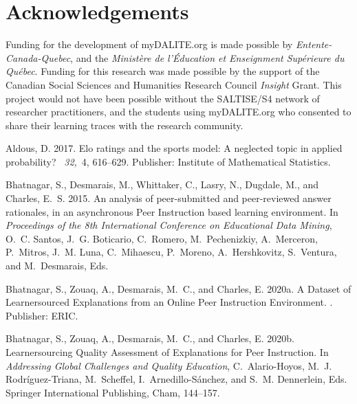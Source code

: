 \documentclass[notitlepage,12pt]{jedm}
\begin{document}
\section*{Acknowledgements}
Funding for the development of myDALITE.org is made possible by 
\textit{Entente-Canada-Quebec}, and the \textit{Ministère de l'Éducation et 
Enseignment Supérieure du Québec}. Funding for this research was made possible 
by the support of the Canadian Social Sciences and Humanities Research Council 
\textit{Insight} Grant. This project would not have been possible without the 
SALTISE/S4 network of researcher practitioners, and the students using 
myDALITE.org who consented to share their learning traces with the research 
community.

 

\begin{thebibliography}{}

{\sc Aldous, D.} 2017.
\newblock Elo ratings and the sports model: {A} neglected topic in applied
  probability?
~{\em 32,\/}~4, 616--629.
\newblock Publisher: Institute of Mathematical Statistics.

{\sc Bhatnagar, S.}, {\sc Desmarais, M.}, {\sc Whittaker, C.}, {\sc Lasry, N.},
  {\sc Dugdale, M.}, {\sc and} {\sc Charles, E.~S.} 2015.
\newblock An analysis of peer-submitted and peer-reviewed answer rationales, in
  an asynchronous {Peer} {Instruction} based learning environment.
\newblock In {\em Proceedings of the 8th {International} {Conference} on
  {Educational} {Data} {Mining}}, {O.~C. Santos}, {J.~G. Boticario},
  {C.~Romero}, {M.~Pechenizkiy}, {A.~Merceron}, {P.~Mitros}, {J.~M. Luna},
  {C.~Mihaescu}, {P.~Moreno}, {A.~Hershkovitz}, {S.~Ventura}, {and}
  {M.~Desmarais}, Eds.

{\sc Bhatnagar, S.}, {\sc Zouaq, A.}, {\sc Desmarais, M.~C.}, {\sc and} {\sc
  Charles, E.} 2020a.
\newblock A {Dataset} of {Learnersourced} {Explanations} from an {Online}
  {Peer} {Instruction} {Environment}.
.
\newblock Publisher: ERIC.

{\sc Bhatnagar, S.}, {\sc Zouaq, A.}, {\sc Desmarais, M.~C.}, {\sc and} {\sc
  Charles, E.} 2020b.
\newblock Learnersourcing {Quality} {Assessment} of {Explanations} for {Peer}
  {Instruction}.
\newblock In {\em Addressing {Global} {Challenges} and {Quality} {Education}},
  {C.~Alario-Hoyos}, {M.~J. Rodríguez-Triana}, {M.~Scheffel},
  {I.~Arnedillo-Sánchez}, {and} {S.~M. Dennerlein}, Eds. Springer
  International Publishing, Cham, 144--157.


\end{thebibliography}
\end{document}
